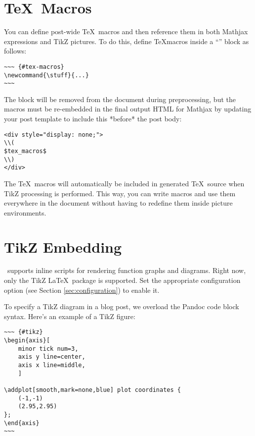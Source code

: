 \documentclass[11pt, letterpaper, oneside, titlepage]{book}
\begin{document}
\section{\TeX\ Macros}

You can define post-wide \TeX\ macros and then reference them in both
Mathjax expressions and TikZ pictures.  To do this, define \TeX macros
inside a ``'' block as follows:

\begin{verbatim}
~~~ {#tex-macros}
\newcommand{\stuff}{...}
~~~
\end{verbatim}

The block will be removed from the document during preprocessing, but
the macros must be re-embedded in the final output HTML for Mathjax by
updating your post template to include this *before* the post body:

\begin{verbatim}
<div style="display: none;">
\\(
$tex_macros$
\\)
</div>
\end{verbatim}

The \TeX\ macros will automatically be included in generated
\TeX\ source when TikZ processing is performed.  This way, you can
write macros and use them everywhere in the document without having to
redefine them inside picture environments.

\section{TikZ Embedding}

\mathblog\ supports inline scripts for rendering function graphs and
diagrams.  Right now, only the TikZ \LaTeX\ package is supported.  Set
the appropriate configuration option (see Section
\ref{sec:configuration}) to enable it.

To specify a TikZ diagram in a blog post, we overload the Pandoc code
block syntax.  Here's an example of a TikZ figure:

\begin{verbatim}
~~~ {#tikz}
\begin{axis}[
    minor tick num=3,
    axis y line=center,
    axis x line=middle,
    ]

\addplot[smooth,mark=none,blue] plot coordinates {
    (-1,-1)
    (2.95,2.95)
};
\end{axis}
~~~
\end{verbatim}
\end{document}
